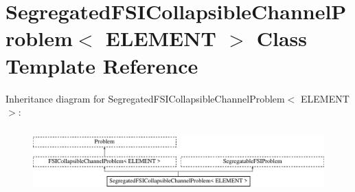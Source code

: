 \hypertarget{classSegregatedFSICollapsibleChannelProblem}{}\section{Segregated\+F\+S\+I\+Collapsible\+Channel\+Problem$<$ E\+L\+E\+M\+E\+NT $>$ Class Template Reference}
\label{classSegregatedFSICollapsibleChannelProblem}
Inheritance diagram for Segregated\+F\+S\+I\+Collapsible\+Channel\+Problem$<$ E\+L\+E\+M\+E\+NT $>$\+:\begin{figure}[H]
\begin{center}
\leavevmode
\includegraphics[height=2.463343cm]{classSegregatedFSICollapsibleChannelProblem}
\end{center}
\end{figure}
